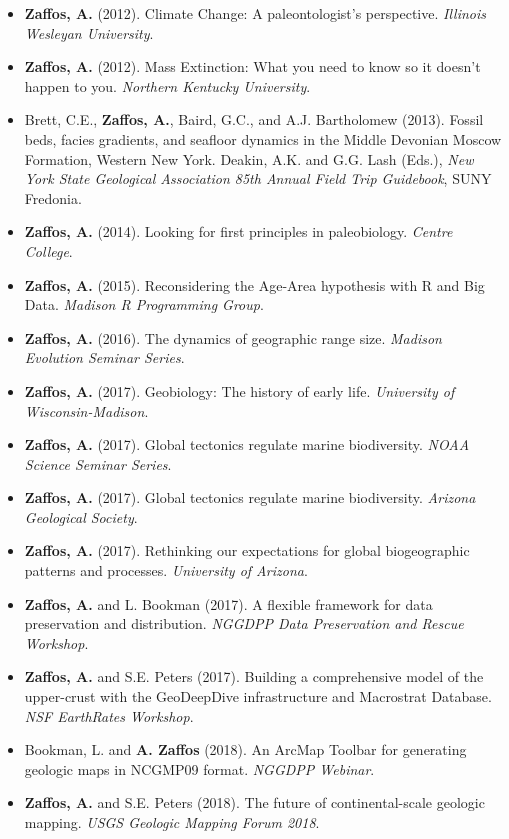 \documentclass[12pt, a4paper]{awesome-cv}
\begin{document}
\fontsize{10pt}{1em}\bodyfontlight\upshape\color{text}
\begin{itemize}[leftmargin=*]
\item{\textbf{Zaffos, A.} (2012). Climate Change: A paleontologist's perspective. \textit{Illinois Wesleyan University}.}
\item{\textbf{Zaffos, A.} (2012). Mass Extinction: What you need to know so it doesn't happen to you. \textit{Northern Kentucky University}.}
\item{Brett, C.E., \textbf{Zaffos, A.}, Baird, G.C., and A.J. Bartholomew (2013). Fossil beds, facies gradients, and seafloor dynamics in the Middle Devonian Moscow Formation, Western New York. Deakin, A.K. and G.G. Lash (Eds.), \textit{New York State Geological Association 85th Annual Field Trip Guidebook}, SUNY Fredonia.}
\item{\textbf{Zaffos, A.} (2014). Looking for first principles in paleobiology. \textit{Centre College}.}
\item{\textbf{Zaffos, A.} (2015). Reconsidering the Age-Area hypothesis with R and Big Data. \textit{Madison R Programming Group}.}
\item{\textbf{Zaffos, A.} (2016). The dynamics of geographic range size. \textit{Madison Evolution Seminar Series}.}
\item{\textbf{Zaffos, A.} (2017). Geobiology: The history of early life. \textit{University of Wisconsin-Madison}.}
\item{\textbf{Zaffos, A.} (2017). Global tectonics regulate marine biodiversity. \textit{NOAA Science Seminar Series}.}
\item{\textbf{Zaffos, A.} (2017). Global tectonics regulate marine biodiversity. \textit{Arizona Geological Society}.}
\item{\textbf{Zaffos, A.} (2017). Rethinking our expectations for global biogeographic patterns and processes. \textit{University of Arizona}.}
\item{\textbf{Zaffos, A.} and L. Bookman (2017). A flexible framework for data preservation and distribution. \textit{NGGDPP Data Preservation and Rescue Workshop}.}
\item{\textbf{Zaffos, A.} and S.E. Peters (2017). Building a comprehensive model of the upper-crust with the GeoDeepDive infrastructure and Macrostrat Database. \textit{NSF EarthRates Workshop}.}
\item{Bookman, L. and \textbf{A. Zaffos} (2018). An ArcMap Toolbar for generating geologic maps in NCGMP09 format. \textit{NGGDPP Webinar}.}
\item{\textbf{Zaffos, A.} and S.E. Peters (2018). The future of continental-scale geologic mapping. \textit{USGS Geologic Mapping Forum 2018}.}
\end{itemize}
\end{document}
